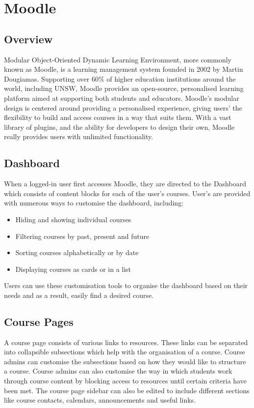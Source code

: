 \section{Moodle}
\subsection{Overview}
Modular Object-Oriented Dynamic Learning Environment, more commonly known as Moodle, is a learning management system founded in 2002 by Martin Dougiamas.
Supporting over 60\% of higher education institutions around the world, including UNSW, Moodle provides an open-source, personalised learning platform aimed at supporting both students and educators.
Moodle's modular design is centered around providing a personalised experience, giving users' the flexibility to build and access courses in a way that suits them.
With a vast library of plugins, and the ability for developers to design their own, Moodle really provides users with unlimited functionality.

\subsection{Dashboard}
When a logged-in user first accesses Moodle, they are directed to the Dashboard which consists of content blocks for each of the user's courses.
User's are provided with numerous ways to customise the dashboard, including:

\begin{itemize}
    \item Hiding and showing individual courses
    \item Filtering courses by past, present and future
    \item Sorting courses alphabetically or by date
    \item Displaying courses as cards or in a list
\end{itemize}

Users can use these customisation tools to organise the dashboard based on their needs and as a result, easily find a desired course.

\subsection{Course Pages}
A course page consists of various links to resources. These links can be separated into collapsible subsections which help with the organisation of a course.
Course admins can customise the subsections based on how they would like to structure a course.
Course admins can also customise the way in which students work through course content by blocking access to resources until certain criteria have been met.
The course page sidebar can also be edited to include different sections like course contacts, calendars, announcements and useful links.

